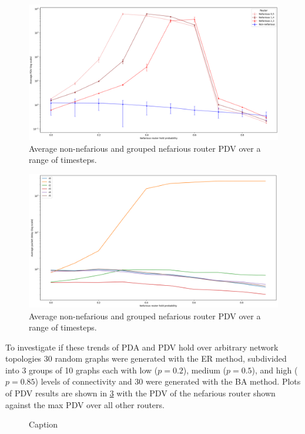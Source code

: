 \begin{figure}[H]
    \centering
    \includegraphics[width=\textwidth]{figs/results/nef_expanded_summary.png}
    \caption{Average non-nefarious and grouped nefarious router PDV over a range of timesteps.}
    \label{fig:MrouterPDV}
\end{figure}
\begin{figure}[H]
    \centering
    \includegraphics[width=\textwidth]{figs/results/1_nef_avg.png}
    \caption{Average non-nefarious and grouped nefarious router PDV over a range of timesteps.}
    \label{fig:MrouterPDA}
\end{figure}

To investigate if these trends of PDA and PDV hold over arbitrary network topologies 30 random graphs were generated with the ER method, subdivided into 3 groups of 10 graphs each with low ($p=0.2$), medium ($p=0.5$), and high ($p=0.85$) levels of connectivity and 30 were generated with the BA method. Plots of PDV results are shown in \cref{fig:Rrandgraphpdv} with the PDV of the nefarious router shown against the max PDV over all other routers.

\begin{figure}[H]
    \centering
    \caption{Caption}
    \label{fig:Rrandgraphpdv}
\end{figure}


